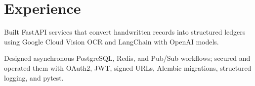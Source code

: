 \documentclass[letterpaper]{deedy-resume} %
\begin{document}
\begin{minipage}[t]{0.66\textwidth} %


\section{Experience}


\vspace{\topsep} %
\begin{tightitemize}
  \item Built FastAPI services that convert handwritten records into structured ledgers using Google Cloud Vision OCR and LangChain with OpenAI models.
  \item Designed asynchronous PostgreSQL, Redis, and Pub/Sub workflows; secured and operated them with OAuth2, JWT, signed URLs, Alembic migrations, structured logging, and pytest.
\end{tightitemize}

\sectionspace %


\end{minipage}
\end{document}
